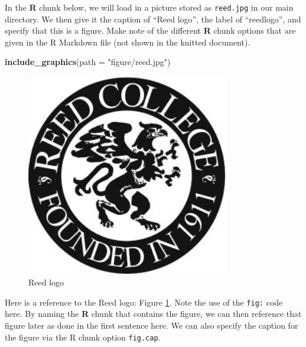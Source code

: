 \documentclass[12pt,twoside]{reedthesis}
\newenvironment{Shaded}{\begin{snugshade}}{\end{snugshade}}
\newcommand{\DataTypeTok}[1]{\textcolor[rgb]{0.13,0.29,0.53}{#1}}
\newcommand{\KeywordTok}[1]{\textcolor[rgb]{0.13,0.29,0.53}{\textbf{#1}}}
\newcommand{\NormalTok}[1]{#1}
\newcommand{\StringTok}[1]{\textcolor[rgb]{0.31,0.60,0.02}{#1}}
\begin{document}
In the \textbf{R} chunk below, we will load in a picture stored as \texttt{reed.jpg} in our main directory. We then give it the caption of ``Reed logo'', the label of ``reedlogo'', and specify that this is a figure. Make note of the different \textbf{R} chunk options that are given in the R Markdown file (not shown in the knitted document).
\begin{Shaded}
\begin{Highlighting}[]
\KeywordTok{include_graphics}\NormalTok{(}\DataTypeTok{path =} \StringTok{"figure/reed.jpg"}\NormalTok{)}
\end{Highlighting}
\end{Shaded}
\begin{figure}
\includegraphics[width=3.47in]{figure/reed} \caption{Reed logo}\label{fig:reedlogo}
\end{figure}
Here is a reference to the Reed logo: Figure \ref{fig:reedlogo}. Note the use of the \texttt{fig:} code here. By naming the \textbf{R} chunk that contains the figure, we can then reference that figure later as done in the first sentence here. We can also specify the caption for the figure via the R chunk option \texttt{fig.cap}.

\clearpage
\end{document}
